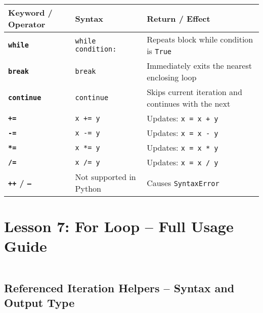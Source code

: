 \documentclass[a4paper,11pt]{article}
\begin{document}
	\begin{tabular}{>{\bfseries}p{4cm} p{7.5cm} p{3cm}}
		\toprule
		Keyword / Operator & Syntax & Return / Effect \\
		\midrule
		
		\texttt{while} & \texttt{while condition:} & Repeats block while condition is \texttt{True} \\
		
		\texttt{break} & \texttt{break} & Immediately exits the nearest enclosing loop \\
		
		\texttt{continue} & \texttt{continue} & Skips current iteration and continues with the next \\
		
		\texttt{+=} & \texttt{x += y} & Updates: \texttt{x = x + y} \\
		
		\texttt{-=} & \texttt{x -= y} & Updates: \texttt{x = x - y} \\
		
		\texttt{*=} & \texttt{x *= y} & Updates: \texttt{x = x * y} \\
		
		\texttt{/=} & \texttt{x /= y} & Updates: \texttt{x = x / y} \\
		
		\texttt{++} / \texttt{--} & Not supported in Python & Causes \texttt{SyntaxError} \\
		
		\bottomrule
	\end{tabular}
	
	

	\section{Lesson 7: For Loop – Full Usage Guide}
	\inputminted{python}{Python_Files/for_loop_guid.py}
	
	\vspace{1em}
	\subsection*{Referenced Iteration Helpers – Syntax and Output Type}
	
\end{document}
